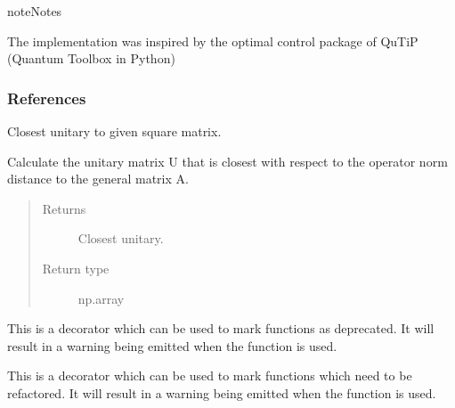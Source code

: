 \documentclass[letterpaper,10pt,english]{sphinxmanual}
\begin{document}
\begin{sphinxadmonition}{note}{Notes}

The implementation was inspired by the optimal control package of QuTiP 
(Quantum Toolbox in Python)
\end{sphinxadmonition}
\subsubsection*{References}

\begin{fulllineitems}
\label{\detokenize{qsim:qsim.util.closest_unitary}}
Closest unitary to given square matrix.

Calculate the unitary matrix U that is closest with respect to the
operator norm distance to the general matrix A.
\begin{quote}\begin{description}
\item[{Returns}] \leavevmode
{} \textendash{} Closest unitary.

\item[{Return type}] \leavevmode
np.array

\end{description}\end{quote}

\end{fulllineitems}


\begin{fulllineitems}
\label{\detokenize{qsim:qsim.util.deprecated}}
This is a decorator which can be used to mark functions
as deprecated. It will result in a warning being emitted
when the function is used.

\end{fulllineitems}


\begin{fulllineitems}
\label{\detokenize{qsim:qsim.util.needs_refactoring}}
This is a decorator which can be used to mark functions
which need to be refactored. It will result in a warning being emitted
when the function is used.

\end{fulllineitems}
\end{document}
